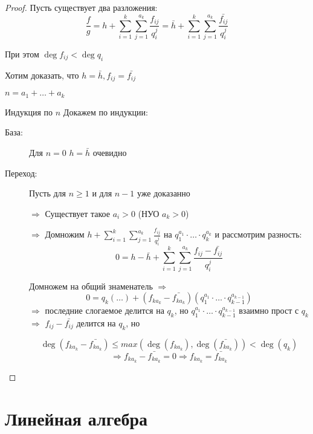 \begin{proof}
Пусть существует два разложения:
$$\frac{f}{g} = h + \sum_{i=1}^k\sum_{j=1}^{a_k} \frac{f_{ij}}{q_i^j}
 = \bar{h} + \sum_{i=1}^k\sum_{j=1}^{a_k} \frac{\bar{f_{ij}}}{q_i^j}$$

При этом $\deg f_{ij} < \deg q_{i}$

Хотим доказать, что $h = \bar{h}, f_{ij} = \bar{f_{ij}}$

$n = a_1 + \dots + a_k$

Индукция по $n$
Докажем по индукции:
\begin{description}
\item[База:] Для $n = 0$ $h = \bar{h}$
очевидно
\item[Переход:] Пусть для $n \ge 1$ и для $n - 1$ уже доказанно

$\Rightarrow$ Существует такое $a_i > 0$ (НУО $a_k > 0$)

$\Rightarrow$ Домножим $h + \sum_{i=1}^k\sum_{j=1}^{a_k} \frac{f_{ij}}{q_i^j}$ на
$q_1^{a_1} \cdot \dots \cdot q_k^{a_k}$ и рассмотрим разность:
$$0 = h - \bar{h} + \sum_{i=1}^k\sum_{j=1}^{a_k} \frac{f_{ij} - \bar{f_{ij}}}{q_i^j}$$

Домножем на общий знаменатель $\Rightarrow$
$$0 = q_k (\dots) + (f_{ka_k} - \bar{f_{ka_k}})(q_1^{a_1}\cdot\dots\cdot q_{k-1}^{a_{k-1}})$$
$\Rightarrow$ последние слогаемое делится на $q_k$, но $q_1^{a_1}\cdot\dots\cdot q_{k-1}^{a_{k-1}}$
взаимно прост с $q_k$ $\Rightarrow$ $f_{ij} - \bar{f_{ij}}$ делится на $q_k$, но

$$\deg(f_{ka_k} - \bar{f_{ka_k}}) \le max(\deg(f_{ka_k}), \deg(\bar{f_{ka_k}})) < \deg(q_k)$$
$$\Rightarrow f_{ka_k} - \bar{f_{ka_k}} = 0 \Rightarrow f_{ka_k} = \bar{f_{ka_k}}$$
\end{description}
\end{proof}  

\chapter{Линейная алгебра}
